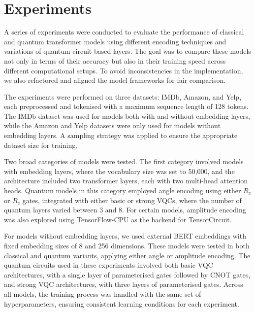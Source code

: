 \section{Experiments}
\label{sec:experiments}
A series of experiments were conducted to evaluate the performance of
classical and quantum transformer models using different encoding
techniques and variations of quantum circuit-based layers. The goal
was to compare these models not only in terms of
their accuracy but also in their training speed across different
computational setups. To avoid inconsistencies in the implementation,
we also refactored and aligned the model frameworks for fair comparison.

The experiments were performed on three datasets: IMDb, Amazon, and
Yelp, each preprocessed and tokenised with a maximum sequence length
of 128 tokens. The IMDb dataset was used for models both with and
without embedding layers, while the Amazon and Yelp datasets were
only used for models without embedding layers. A sampling strategy
was applied to ensure the appropriate dataset size for training.

Two broad categories of models were tested. The first category
involved models with embedding layers, where the vocabulary size was
set to 50,000, and the architecture included two transformer layers,
each with two multi-head attention heads. Quantum models in this
category employed angle encoding using either \(R_x\) or \(R_z\) gates,
integrated with either basic or strong \glspl{VQC}, where the number
of quantum layers varied between 3 and 8.
For certain models, amplitude encoding was also explored using
TensorFlow-CPU as the backend for TensorCircuit.

For models without embedding layers, we used external \gls{BERT} embeddings
with fixed embedding sizes of 8 and 256 dimensions. These models were
tested in both classical and quantum variants, applying either angle
or amplitude encoding. The quantum circuits used in these experiments
involved both basic \gls{VQC} architectures, with a single layer of
parameterised gates followed by CNOT gates, and strong \gls{VQC}
architectures, with three layers of parameterised gates. Across all
models, the training process was handled with the same set of
hyperparameters, ensuring consistent learning conditions for each experiment.


